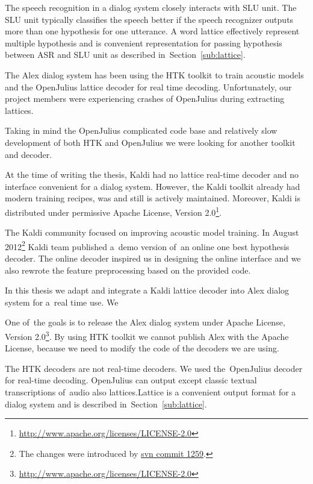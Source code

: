 The speech recognition in a dialog system closely interacts with \acl{SLU} unit.
The \ac{SLU} unit typically classifies the speech better 
if the speech recognizer outputs more than one hypothesis for one utterance. 
A word lattice effectively represent multiple hypothesis and is convenient
representation for passing hypothesis between \ac{ASR} and \ac{SLU} unit 
as described in~Section~\ref{sub:lattice}.

The Alex dialog system has been using the \ac{HTK} toolkit\cite{young94htk} 
to train acoustic models and 
the OpenJulius\cite{lee2009julius} lattice decoder for real time decoding. 
Unfortunately, our project members were experiencing crashes 
of OpenJulius during extracting lattices.

Taking in mind the OpenJulius complicated code base and relatively slow
development of both \ac{HTK} and OpenJulius we were looking for another toolkit and decoder.

At the time of writing the thesis, Kaldi had no lattice real-time decoder
and no interface convenient for a dialog system.
However, the Kaldi toolkit already had modern training recipes, 
was and still is actively maintained. Moreover, Kaldi is distributed 
under permissive Apache License, Version 2.0\footnote{\url{http://www.apache.org/licenses/LICENSE-2.0}}.

The Kaldi community focused on improving acoustic model training. 
In August 2012\footnote{The changes were introduced by \href{https://sourceforge.net/p/kaldi/code/1259/}{svn commit 1259}.}
Kaldi team published a~demo version of~an online one best hypothesis decoder.
The online decoder inspired us in designing the online interface and
we also rewrote the feature preprocessing based on the provided code.



In this thesis we adapt and integrate a Kaldi lattice decoder 
into Alex dialog system for a~real time use. We

One of~the goals is to release the Alex dialog system under 
Apache License, Version 2.0\footnote{\url{http://www.apache.org/licenses/LICENSE-2.0}}. 
By using \ac{HTK} toolkit we cannot publish Alex with the Apache License, 
because we need to modify the code of the decoders we are using. 

The \ac{HTK} decoders are not real-time decoders\cite{yao2010practical}. 
We used the~OpenJulius decoder for real-time decoding. OpenJulius can output except classic textual transcriptions of~audio
also lattices.Lattice is a convenient output format for a dialog system and is described in~Section~\ref{sub:lattice}.


